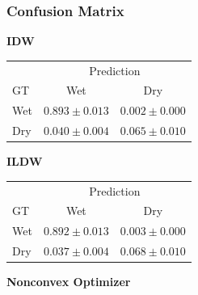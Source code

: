 \documentclass[a4paper,fleqn]{cas-sc}
\begin{document}
\subsubsection{Confusion Matrix}
\begin{table}[!htbp]
  \centering
  \begin{minipage}[t]{0.31\textwidth}
    \centering
    \textbf{IDW}

    \vspace{0.35em}
    \scriptsize
    \begin{tabular}{lcc}
      \toprule
          & \multicolumn{2}{c}{Prediction}                     \\
      GT  & Wet                            & Dry               \\
      \midrule
      Wet & $0.893 \pm 0.013$              & $0.002 \pm 0.000$ \\
      Dry & $0.040 \pm 0.004$              & $0.065 \pm 0.010$ \\
      \bottomrule
    \end{tabular}
  \end{minipage}
  \hfill
  \begin{minipage}[t]{0.31\textwidth}
    \centering
    \textbf{ILDW}

    \vspace{0.35em}
    \scriptsize
    \begin{tabular}{lcc}
      \toprule
          & \multicolumn{2}{c}{Prediction}                     \\
      GT  & Wet                            & Dry               \\
      \midrule
      Wet & $0.892 \pm 0.013$              & $0.003 \pm 0.000$ \\
      Dry & $0.037 \pm 0.004$              & $0.068 \pm 0.010$ \\
      \bottomrule
    \end{tabular}
  \end{minipage}
  \hfill
  \begin{minipage}[t]{0.31\textwidth}
    \centering
    \textbf{Nonconvex Optimizer}


\end{minipage}
\end{table}
\end{document}
